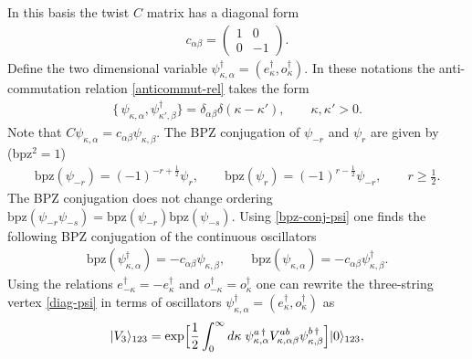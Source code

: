 \documentclass[a4paper,12pt]{article}
\begin{document}
In this basis the twist $C$ matrix has a diagonal form
\begin{gather}
c_{\alpha\beta}=\begin{pmatrix}
  1 & 0 \\
  0 & -1
\end{pmatrix}.
\label{matr-eps-c}
\end{gather}
Define the two dimensional variable
$\psi^{\dag}_{\kappa,\alpha}=(e^{\dag}_{\kappa},o^{\dag}_{\kappa})$.
In these notations
the anti-commutation relation \eqref{anticommut-rel}
takes the form
\begin{gather}
\{\,\psi_{\kappa,\alpha},\psi_{\kappa',\beta}^\dagger \}
=\delta_{\alpha\beta}\delta(\kappa - \kappa'),\qquad
\kappa, \kappa'>0.
\end{gather}
Note that $C\psi_{\kappa,\alpha}=c_{\alpha\beta}\psi_{\kappa,\beta}$.
The BPZ conjugation of $\psi_{-r}$ and $\psi_{r}$ are given by (bpz$^2=1$)
\begin{gather}
\text{bpz}(\psi_{-r})=(-1)^{-r+\tfrac12}\psi_{r},\qquad
\text{bpz}(\psi_{r})=(-1)^{r-\tfrac12}\psi_{-r},\qquad r\geq\tfrac12.
\label{bpz-conj-psi}
\end{gather}
The BPZ conjugation does not change ordering
$\text{bpz}(\psi_{-r}\psi_{-s})=\text{bpz}(\psi_{-r})\text{bpz}(\psi_{-s})$.
Using \eqref{bpz-conj-psi}
one finds the following BPZ conjugation of the continuous oscillators
\begin{gather}
\text{bpz}(\psi^{\dag}_{\kappa,\alpha})=-c_{\alpha\beta}\psi_{\kappa,\beta},\qquad
\text{bpz}(\psi_{\kappa,\alpha})=-c_{\alpha\beta}\psi^{\dag}_{\kappa,\beta}.
\label{bpz-psi-eo}
\end{gather}
Using the relations
$e_{-\kappa}^\dagger=-e_{\kappa}^\dagger$ and
$o_{-\kappa}^\dagger=o_{\kappa}^\dagger$
one can rewrite
the three-string vertex \eqref{diag-psi} in
terms of oscillators
$\psi^{\dag}_{\kappa,\alpha}=(e_{\kappa}^{\dag}, o_{\kappa}^{\dag})$ as
\begin{gather}
|V_3\rangle_{123}
=\exp\Bigl[\frac12 \int_{0}^{\infty}d\kappa\;
\psi^{a\,\dag}_{\kappa,\alpha}V^{ab}_{\kappa,\alpha\beta}
\psi^{b\,\dag}_{\kappa,\beta}\Bigr]
|0\rangle_{123},
\label{vertex-diag}
\end{gather}
\end{document}
